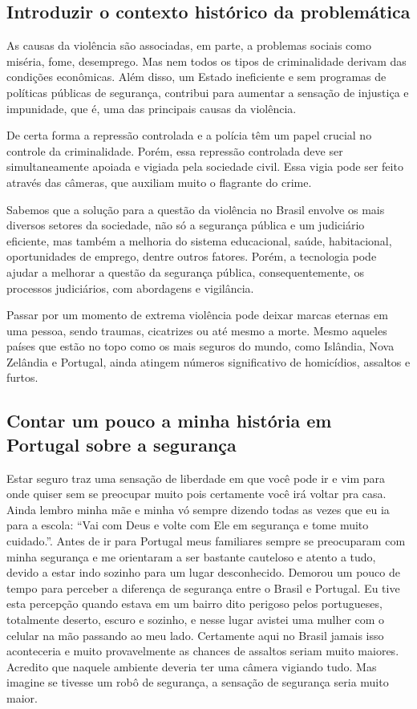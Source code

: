 \documentclass[12pt,a4paper]{article}
\begin{document}
    \subsection{Introduzir o contexto histórico da problemática}
    As causas da violência são associadas, em parte, a problemas sociais como miséria, fome, desemprego. Mas nem todos os tipos de criminalidade derivam das condições econômicas. Além disso, um Estado ineficiente e sem programas de políticas públicas de segurança, contribui para aumentar a sensação de injustiça e impunidade, que é, uma das principais causas da violência.

    De certa forma a repressão controlada e a polícia têm um papel crucial no controle da criminalidade. Porém, essa repressão controlada deve ser simultaneamente apoiada e vigiada pela sociedade civil. Essa vigia pode ser feito através das câmeras, que auxiliam muito o flagrante do crime.

    Sabemos que a solução para a questão da violência no Brasil envolve os mais diversos setores da sociedade, não só a segurança pública e um judiciário eficiente, mas também a melhoria do sistema educacional, saúde, habitacional, oportunidades de emprego, dentre outros fatores. Porém, a tecnologia pode ajudar a melhorar a questão da segurança pública, consequentemente, os processos judiciários, com abordagens e vigilância. 

    Passar por um momento de extrema violência pode deixar marcas eternas em uma pessoa, sendo traumas, cicatrizes ou até mesmo a morte. Mesmo aqueles países que estão no topo como os mais seguros do mundo, como Islândia, Nova Zelândia e Portugal, ainda atingem números significativo de homicídios, assaltos e furtos.

    \subsection{Contar um pouco a minha história em Portugal sobre a segurança}

    Estar seguro traz uma sensação de liberdade em que você pode ir e vim para onde quiser sem se preocupar muito pois certamente você irá voltar pra casa. Ainda lembro minha mãe e minha vó sempre dizendo todas as vezes que eu ia para a escola: “Vai com Deus e volte com Ele em segurança e tome muito cuidado.”. Antes de ir para Portugal meus familiares sempre se preocuparam com minha segurança e me orientaram a ser bastante cauteloso e atento a tudo, devido a estar indo sozinho para um lugar desconhecido. Demorou um pouco de tempo para perceber a diferença de segurança entre o Brasil e Portugal. Eu tive esta percepção quando estava em um bairro dito perigoso pelos portugueses, totalmente deserto, escuro e sozinho, e nesse lugar avistei uma mulher com o celular na mão passando ao meu lado. Certamente aqui no Brasil jamais isso aconteceria e muito provavelmente as chances de assaltos seriam muito maiores. Acredito que naquele ambiente deveria ter uma câmera vigiando tudo. Mas imagine se tivesse um robô de segurança, a sensação de segurança seria muito maior.
\end{document}
